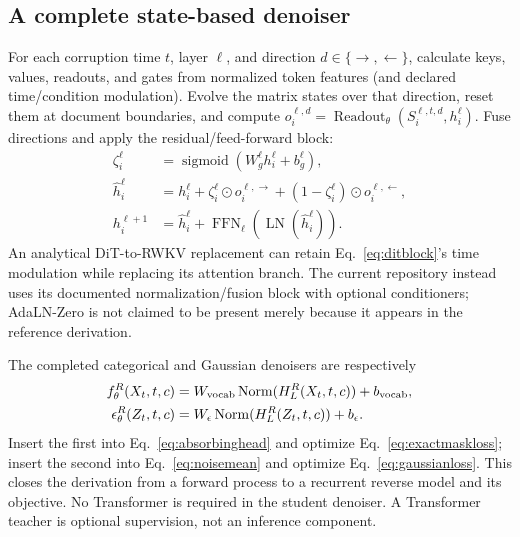 \documentclass{article}
\theoremstyle{remark}\newtheorem{remark}[theorem]{Remark}
\begin{document}
\subsection{A complete state-based denoiser}
For each corruption time $t$, layer $\ell$, and direction $d\in\{\rightarrow,\leftarrow\}$, calculate keys, values, readouts, and gates from normalized token features (and declared time/condition modulation). Evolve the matrix states over that direction, reset them at document boundaries, and compute $o_i^{\ell,d}=\operatorname{Readout}_\theta(S_i^{\ell,t,d},h_i^\ell)$. Fuse directions and apply the residual/feed-forward block:
\begin{align}
 \zeta_i^\ell&=\operatorname{sigmoid}(W_g^\ell h_i^\ell+b_g^\ell),\nonumber\\
 \widehat h_i^\ell&=h_i^\ell+
 \zeta_i^\ell\odot o_i^{\ell,\rightarrow}+(1-\zeta_i^\ell)\odot o_i^{\ell,\leftarrow},\nonumber\\
 h_i^{\ell+1}&=\widehat h_i^\ell+\operatorname{FFN}_\ell(\operatorname{LN}(\widehat h_i^\ell)).
 \label{eq:rwkvdenoiserblock}
\end{align}
An analytical DiT-to-RWKV replacement can retain Eq.~\eqref{eq:ditblock}'s time modulation while replacing its attention branch. The current repository instead uses its documented normalization/fusion block with optional conditioners; AdaLN-Zero is not claimed to be present merely because it appears in the reference derivation.

The completed categorical and Gaussian denoisers are respectively
\begin{align}
 f_\theta^R(X_t,t,c)&=W_{\rm vocab}\operatorname{Norm}(H_L^R(X_t,t,c))+b_{\rm vocab},\nonumber\\
 \epsilon_\theta^R(Z_t,t,c)&=W_\epsilon\operatorname{Norm}(H_L^R(Z_t,t,c))+b_\epsilon.
 \label{eq:finaldenoisers}
\end{align}
Insert the first into Eq.~\eqref{eq:absorbinghead} and optimize Eq.~\eqref{eq:exactmaskloss}; insert the second into Eq.~\eqref{eq:noisemean} and optimize Eq.~\eqref{eq:gaussianloss}. This closes the derivation from a forward process to a recurrent reverse model and its objective. No Transformer is required in the student denoiser. A Transformer teacher is optional supervision, not an inference component.
\end{document}
